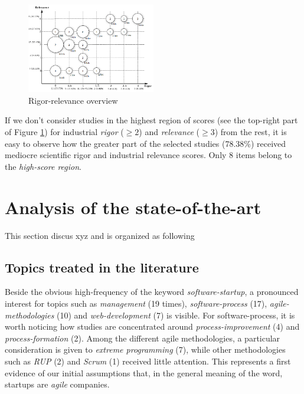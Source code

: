 \documentclass[final,5p,times,twocolumn]{elsarticle}
\begin{document}
\begin{figure}[H]
\centering
\includegraphics[width=0.50\textwidth,keepaspectratio=true]{figures/rigor-relevance-map.png}
\caption{Rigor-relevance overview}\label{fig:ms:rigor-rel-map}
\end{figure}


If we don’t consider studies in the highest region of scores (see the top-right part of Figure \ref{fig:ms:rigor-rel-map}) for industrial \textit{rigor} ($\geq 2$) and \textit{relevance} ($\geq 3$) from the rest, it is easy to observe how the greater part of the selected studies (78.38\%) received mediocre scientific rigor and industrial relevance scores. Only 8 items belong to the \textit{high-score region}.


\section{Analysis of the state-of-the-art} %
 \label{sect:discussion}
This section discus xyz and is organized as following

\subsection{Topics treated in the literature}

Beside the obvious high-frequency of the keyword \textit{software-startup}, a pronounced interest for topics such as \textit{management}  (19 times), \textit{software-process} (17),  \textit{agile-methodologies} (10)  and \textit{web-development} (7) is visible. For software-process, it is worth noticing how studies are concentrated around \textit{process-improvement} (4) and \textit{process-formation} (2).  Among the different agile methodologies, a particular consideration is given to \textit{extreme programming} (7), while other methodologies such as \textit{RUP} (2) and \textit{Scrum} (1) received little attention. This represents a first evidence of our initial assumptions that, in the general meaning of the word, startups are \textit{agile} companies.
\end{document}
